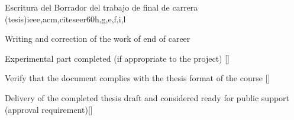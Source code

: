 \begin{syllabus}
\begin{unit}{Escritura del Borrador del trabajo de final de carrera (tesis)}{}{ieee,acm,citeseer}{60}{h,g,e,f,i,l}
\begin{topics}
    \item Writing and correction of the work of end of career
\end{topics}

\begin{learningoutcomes}
    \item Experimental part completed (if appropriate to the project) [\Assessment]
    \item Verify that the document complies with the thesis format of the course [\Assessment]
    \item Delivery of the completed thesis draft and considered ready for public support (approval requirement)[\Assessment]
\end{learningoutcomes}
\end{unit}

\begin{coursebibliography}
\end{coursebibliography}
\end{syllabus}
